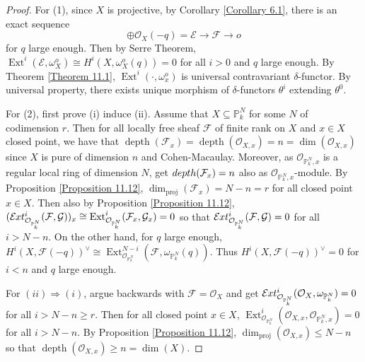 \documentclass{ctexart}
\newcommand{\depth}{\operatorname{depth}}
\newcommand{\projdim}{\dim_{\operatorname{proj}}}
\newcommand{\ext}{\operatorname{Ext}}
\newcommand{\sheafext}{\mathcal{E}\kern -.5pt xt}
\begin{document}
\begin{proof}
    For (1), since $X$ is projective, by Corollary \ref{Corollary 6.1}, there is an exact sequence
    \begin{equation*}
        \oplus \mathcal{O}_{X}(-q) = \mathcal{E} \longrightarrow \mathcal{F} \longrightarrow o
    \end{equation*}
    for $q$ large enough.
    Then by Serre Theorem, $\ext^{i}(\mathcal{E}, \omega_{X}^{o}) \cong H^{i}(X, \omega_{X}^{o}(q)) = 0$ for all $i > 0$ and $q$ large enough.
    By Theorem \ref{Theorem 11.1}, $\ext^{i}(\cdot, \omega_{x}^{o})$ is universal contravariant $\delta$-functor.
    By universal property, there exists unique morphism of $\delta$-functors $\theta^{i}$ extending $\theta^{0}$.
    \par
    For (2), first prove (i) induce (ii).
    Assume that $X \subseteq \mathbb{P}_{k}^{N}$ for some $N$ of codimension $r$.
    Then for all locally free sheaf $\mathcal{F}$ of finite rank on $X$ and $x\in X$ closed point,
    we have that $\depth(\mathcal{F}_{x}) = \depth(\mathcal{O}_{X, x}) = n = \dim(\mathcal{O}_{X, x})$ since $X$ is pure of dimension $n$ and Cohen-Macaulay.
    Moreover, as $\mathcal{O}_{\mathbb{P}_{k}^{N}, x}$ is a regular local ring of dimension $N$, get $\\depth(\mathcal{F}_{x}) = n$ also as $\mathcal{O}_{\mathbb{P}_{k}^{N}, x}$-module.
    By Proposition \ref{Proposition 11.12}, $\projdim(\mathcal{F}_{x}) = N - n = r$ for all closed point $x\in X$.
    Then also by Proposition \ref{Proposition 11.12}, $(\sheafext_{\mathcal{O}_{\mathbb{P}_{k}^{N}}}^{i}(\mathcal{F}, \mathcal{G}))_{x} \cong \ext_{\mathcal{O}_{\mathbb{P}_{k}^{N}}}^{i}(\mathcal{F}_{x}, \mathcal{G}_{x}) = 0$ so that $\sheafext_{\mathcal{O}_{\mathbb{P}_{k}^{N}}}^{i}(\mathcal{F}, \mathcal{G}) = 0$ for all $i > N - n$.
    On the other hand, for $q$ large enough, $H^{i}(X, \mathcal{F}(-q))^{\lor} \cong \ext_{\mathcal{O}_{\mathbb{P}_{k}^{N}}}^{N - i}(\mathcal{F}, \omega_{\mathbb{P}_{k}^{N}}(q))$.
    Thus $H^{i}(X, \mathcal{F}(-q))^{\lor} = 0$ for $i < n$ and $q$ large enough.
    \par
    For $(ii) \Rightarrow (i)$, argue backwards with $\mathcal{F} = \mathcal{O}_{X}$ and get $\sheafext_{\mathcal{O}_{\mathbb{P}_{k}^{N}}}^{i}(\mathcal{O}_{X}, \omega_{\mathbb{P}_{k}^{N}}) = 0$ for all $i > N - n \ge r$.
    Then for all closed point $x\in X$, $\ext_{\mathcal{O}_{\mathbb{P}_{k}^{N}}}^{i}(\mathcal{O}_{X, x}, \mathcal{O}_{\mathbb{P}_{k}^{N}, x}) = 0$ for all $i > N - n$.
    By Proposition \ref{Proposition 11.12}, $\projdim(\mathcal{O}_{X, x}) \le N - n$ so that $\depth(\mathcal{O}_{X, x}) \ge n = \dim(X)$.

\end{proof}
\end{document}
